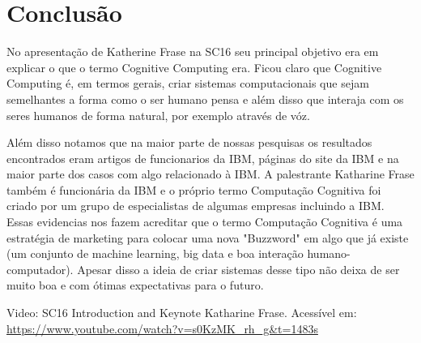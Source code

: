 \documentclass[12pt]{article}
\begin{document}
\section{Conclusão}
No apresentação de Katherine Frase na SC16 seu principal objetivo era
em explicar o que o termo Cognitive Computing era. Ficou claro que 
Cognitive Computing é, em termos gerais, criar sistemas computacionais
que sejam semelhantes a forma como o ser humano pensa e além disso
que interaja com os seres humanos de forma natural, por exemplo através
de vóz.

Além disso notamos que na maior parte de nossas pesquisas os resultados
encontrados eram artigos de funcionarios da IBM, páginas do site da IBM 
e na maior parte dos casos com algo relacionado à IBM. A palestrante
Katharine Frase também é funcionária da IBM e o próprio termo Computação
Cognitiva foi criado por um grupo de especialistas de algumas empresas
incluindo a IBM. Essas evidencias nos fazem acreditar que o termo 
Computação Cognitiva é uma estratégia de marketing para colocar uma nova
"Buzzword" em algo que já existe (um conjunto de machine learning, big 
data e boa interação humano-computador). Apesar disso a ideia de criar 
sistemas desse tipo não deixa de ser muito boa e com ótimas expectativas
para o futuro.

\pagebreak
\begin{thebibliography}{1}
 Video: SC16 Introduction and Keynote
    Katharine Frase. Acessível em: 
    \url{https://www.youtube.com/watch?v=s0KzMK_rh_g&t=1483s}
\end{thebibliography}
\end{document}
